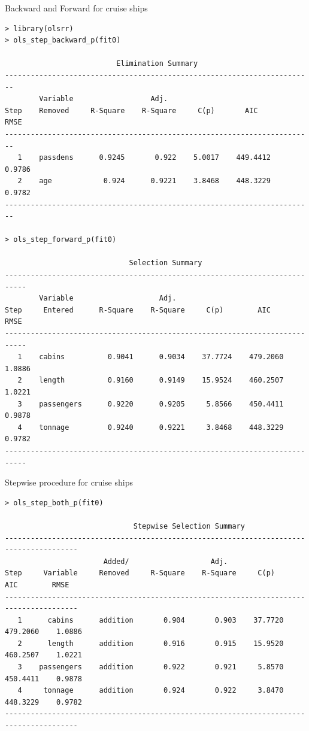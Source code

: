 \documentclass{beamer}
\begin{document}
\begin{frame}[fragile]{Backward and Forward for cruise ships}
\begin{scriptsize}
\begin{verbatim}
> library(olsrr)
> ols_step_backward_p(fit0)

                          Elimination Summary                            
------------------------------------------------------------------------
        Variable                  Adj.                                      
Step    Removed     R-Square    R-Square     C(p)       AIC        RMSE     
------------------------------------------------------------------------
   1    passdens      0.9245       0.922    5.0017    449.4412    0.9786    
   2    age            0.924      0.9221    3.8468    448.3229    0.9782    
------------------------------------------------------------------------

> ols_step_forward_p(fit0)

                             Selection Summary                              
---------------------------------------------------------------------------
        Variable                    Adj.                                       
Step     Entered      R-Square    R-Square     C(p)        AIC        RMSE     
---------------------------------------------------------------------------
   1    cabins          0.9041      0.9034    37.7724    479.2060    1.0886    
   2    length          0.9160      0.9149    15.9524    460.2507    1.0221    
   3    passengers      0.9220      0.9205     5.8566    450.4411    0.9878    
   4    tonnage         0.9240      0.9221     3.8468    448.3229    0.9782    
---------------------------------------------------------------------------
\end{verbatim}
\end{scriptsize}    
\end{frame}

\begin{frame}[fragile]{Stepwise procedure for cruise ships}
\begin{tiny}
\begin{verbatim}
> ols_step_both_p(fit0)

                              Stepwise Selection Summary                                
---------------------------------------------------------------------------------------
                       Added/                   Adj.                                       
Step     Variable     Removed     R-Square    R-Square     C(p)        AIC        RMSE     
---------------------------------------------------------------------------------------
   1      cabins      addition       0.904       0.903    37.7720    479.2060    1.0886    
   2      length      addition       0.916       0.915    15.9520    460.2507    1.0221    
   3    passengers    addition       0.922       0.921     5.8570    450.4411    0.9878    
   4     tonnage      addition       0.924       0.922     3.8470    448.3229    0.9782    
---------------------------------------------------------------------------------------    
\end{verbatim}
\end{tiny}
\end{frame}
\end{document}
